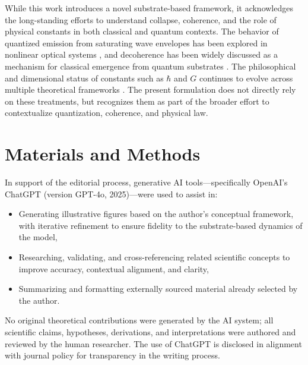 \documentclass[entropy,article,submit,pdftex,moreauthors]{Definitions/mdpi}
\begin{document}
While this work introduces a novel substrate-based framework, it acknowledges the long-standing efforts to understand collapse, coherence, and the role of physical constants in both classical and quantum contexts. The behavior of quantized emission from saturating wave envelopes has been explored in nonlinear optical systems \cite{boyd2008}, and decoherence has been widely discussed as a mechanism for classical emergence from quantum substrates \cite{zurek2003}. The philosophical and dimensional status of constants such as $\hbar$ and $G$ continues to evolve across multiple theoretical frameworks \cite{duff2002}. The present formulation does not directly rely on these treatments, but recognizes them as part of the broader effort to contextualize quantization, coherence, and physical law.


\section{Materials and Methods}
\qsdmethodstatement

In support of the editorial process, generative AI tools—specifically OpenAI's ChatGPT (version GPT-4o, 2025)—were used to assist in:
\begin{itemize}
    \item Generating illustrative figures based on the author’s conceptual framework, with iterative refinement to ensure fidelity to the substrate-based dynamics of the model,
    \item Researching, validating, and cross-referencing related scientific concepts to improve accuracy, contextual alignment, and clarity,
    \item Summarizing and formatting externally sourced material already selected by the author.
\end{itemize}

No original theoretical contributions were generated by the AI system; all scientific claims, hypotheses, derivations, and interpretations were authored and reviewed by the human researcher. The use of ChatGPT is disclosed in alignment with journal policy for transparency in the writing process.

\end{document}
